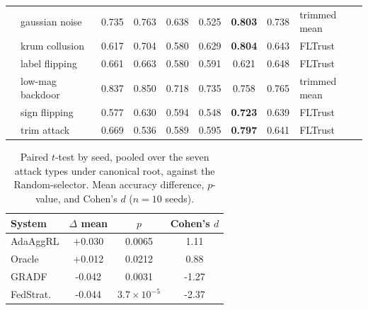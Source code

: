 \begin{table}[t]
\begin{tabular}{llccccccl}
 & gaussian noise & 0.735 & 0.763 & 0.638 & 0.525 & \textbf{0.803} & 0.738 & trimmed mean \\
 & krum collusion & 0.617 & 0.704 & 0.580 & 0.629 & \textbf{0.804} & 0.643 & FLTrust \\
 & label flipping & 0.661 & 0.663 & 0.580 & 0.591 & 0.621 & 0.648 & FLTrust \\
 & low-mag backdoor & 0.837 & 0.850 & 0.718 & 0.735 & 0.758 & 0.765 & trimmed mean \\
 & sign flipping & 0.577 & 0.630 & 0.594 & 0.548 & \textbf{0.723} & 0.639 & FLTrust \\
 & trim attack & 0.669 & 0.536 & 0.589 & 0.595 & \textbf{0.797} & 0.641 & FLTrust \\
\bottomrule
\end{tabular}
\end{table}

\begin{table}[t]
\centering
\caption{Paired $t$-test by seed, pooled over the seven attack types under canonical root, against the Random-selector. Mean accuracy difference, $p$-value, and Cohen's $d$ ($n=10$ seeds).}
\label{tab:pooled-vs-random}
\begin{tabular}{lccc}
\toprule
System & $\Delta$ mean & $p$ & Cohen's $d$ \\
\midrule
AdaAggRL & +0.030 & 0.0065 & 1.11 \\
Oracle & +0.012 & 0.0212 & 0.88 \\
GRADF & -0.042 & 0.0031 & -1.27 \\
FedStrat. & -0.044 & $3.7\times10^{-5}$ & -2.37 \\
\bottomrule
\end{tabular}
\end{table}

